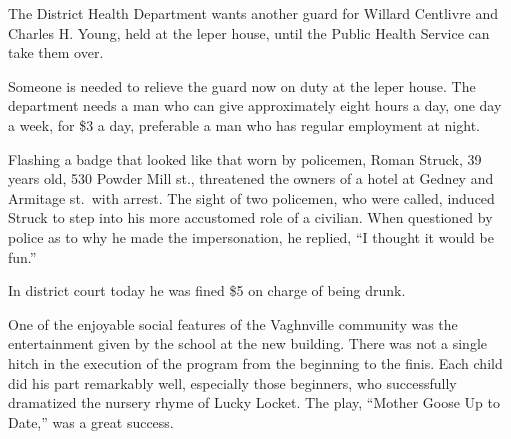 \documentclass{newspaper1920}
\begin{document}
\begin{multicols}{3}
\halfrule


The District Health Department wants another guard for Willard
Centlivre and Charles H. Young, held at the leper house, until the
Public Health Service can take them over.

Someone is needed to relieve the guard now on duty at the leper house.
The department needs a man who can give approximately eight hours a
day, one day a week, for \$3 a day, preferable a man who has regular
employment at night.

\halfrule


Flashing a badge that looked like that worn by policemen, Roman
Struck, 39 years old, 530 Powder Mill st., threatened the owners of a
hotel at Gedney and Armitage st.\ with arrest.  The sight of two
policemen, who were called, induced Struck to step into his more
accustomed role of a civilian.  When questioned by police as to why he
made the impersonation, he replied, ``I thought it would be fun.''

In district court today he was fined \$5 on charge of being drunk.

\halfrule


One of the enjoyable social features of the Vaghnville community was
the entertainment given by the school at the new building.  There was
not a single hitch in the execution of the program from the beginning
to the finis.  Each child did his part remarkably well, especially
those beginners, who successfully dramatized the nursery rhyme of
Lucky Locket.  The play, ``Mother Goose Up to Date,'' was a great
success.

\end{multicols}
\end{document}
